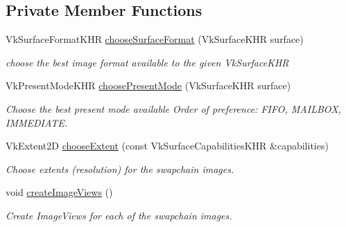 \subsection*{Private Member Functions}
\begin{DoxyCompactItemize}
\item 
Vk\+Surface\+Format\+K\+HR \mbox{\hyperlink{class_swapchain_adf8974fc6cde1ce9b5359b9ea1443018}{choose\+Surface\+Format}} (Vk\+Surface\+K\+HR surface)
\begin{DoxyCompactList}\small\item\em choose the best image format available to the given Vk\+Surface\+K\+HR \end{DoxyCompactList}\item 
Vk\+Present\+Mode\+K\+HR \mbox{\hyperlink{class_swapchain_a871b68d6d79fe8ead853252e0c1f2954}{choose\+Present\+Mode}} (Vk\+Surface\+K\+HR surface)
\begin{DoxyCompactList}\small\item\em Choose the best present mode available Order of preference\+: F\+I\+FO, M\+A\+I\+L\+B\+OX, I\+M\+M\+E\+D\+I\+A\+TE. \end{DoxyCompactList}\item 
Vk\+Extent2D \mbox{\hyperlink{class_swapchain_ac336660395258258bbc2f13c18b261f8}{choose\+Extent}} (const Vk\+Surface\+Capabilities\+K\+HR \&capabilities)
\begin{DoxyCompactList}\small\item\em Choose extents (resolution) for the swapchain images. \end{DoxyCompactList}\item 
\mbox{\label{class_swapchain_ad61aed2fb65673f65bf5f070e386446e}} 
void \mbox{\hyperlink{class_swapchain_ad61aed2fb65673f65bf5f070e386446e}{create\+Image\+Views}} ()
\begin{DoxyCompactList}\small\item\em Create Image\+Views for each of the swapchain images. \end{DoxyCompactList}\end{DoxyCompactItemize}
